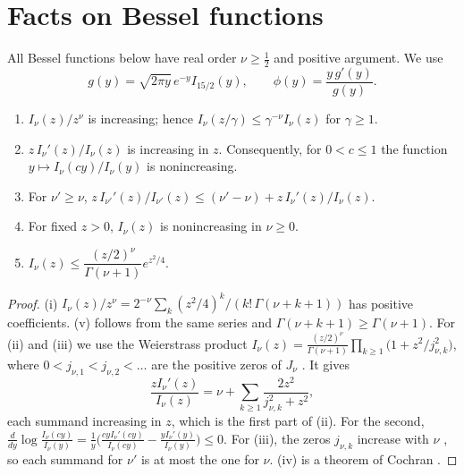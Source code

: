\section{Facts on Bessel functions}\label{sec:bessel}

All Bessel functions below have real order $\nu\ge\frac12$ and positive argument. We use
\begin{equation}\label{eq:gdef}
g(y)=\sqrt{2\pi y}\,e^{-y}I_{15/2}(y),\qquad \phi(y)=\frac{y\,g'(y)}{g(y)}.
\end{equation}

\begin{lemma}\label{lem:besselbasic}
\begin{enumerate}
\item[(i)] $I_\nu(z)/z^\nu$ is increasing; hence $I_\nu(z/\gamma)\le\gamma^{-\nu}I_\nu(z)$ for $\gamma\ge1$.
\item[(ii)] $z\,I_\nu'(z)/I_\nu(z)$ is increasing in $z$. Consequently, for $0<c\le1$ the function $y\mapsto I_\nu(cy)/I_\nu(y)$ is nonincreasing.
\item[(iii)] For $\nu'\ge\nu$, $z\,I_{\nu'}'(z)/I_{\nu'}(z)\le(\nu'-\nu)+z\,I_\nu'(z)/I_\nu(z)$.
\item[(iv)] For fixed $z>0$, $I_\nu(z)$ is nonincreasing in $\nu\ge0$.
\item[(v)] $I_\nu(z)\le\dfrac{(z/2)^\nu}{\Gamma(\nu+1)}e^{z^2/4}$.
\end{enumerate}
\end{lemma}

\begin{proof}
(i) $I_\nu(z)/z^\nu=2^{-\nu}\sum_k(z^2/4)^k/(k!\,\Gamma(\nu+k+1))$ has positive coefficients. (v) follows from the same series and $\Gamma(\nu+k+1)\ge\Gamma(\nu+1)$. For (ii) and (iii) we use the Weierstrass product $I_\nu(z)=\frac{(z/2)^\nu}{\Gamma(\nu+1)}\prod_{k\ge1}\big(1+z^2/j_{\nu,k}^2\big)$, where $0<j_{\nu,1}<j_{\nu,2}<\dots$ are the positive zeros of $J_\nu$ \cite[\S15.41]{Wat44}. It gives
\[
\frac{zI_\nu'(z)}{I_\nu(z)}=\nu+\sum_{k\ge1}\frac{2z^2}{j_{\nu,k}^2+z^2},
\]
each summand increasing in $z$, which is the first part of (ii). For the second, $\frac{d}{dy}\log\frac{I_\nu(cy)}{I_\nu(y)}=\frac1y\Big(\frac{cyI_\nu'(cy)}{I_\nu(cy)}-\frac{yI_\nu'(y)}{I_\nu(y)}\Big)\le0$. For (iii), the zeros $j_{\nu,k}$ increase with $\nu$ \cite[\S15.6]{Wat44}, so each summand for $\nu'$ is at most the one for $\nu$. (iv) is a theorem of Cochran \cite{Coc67}.
\end{proof}

